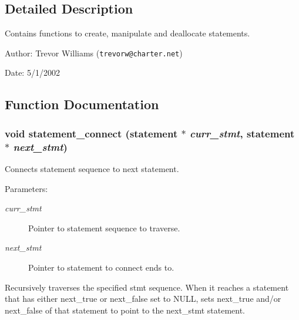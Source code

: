 

\subsection{Detailed Description}
Contains functions to create, manipulate and deallocate statements.

\begin{Desc}
\item[Author:]Trevor Williams ({\tt trevorw@charter.net}) \end{Desc}
\begin{Desc}
\item[Date:]5/1/2002 \end{Desc}


\subsection{Function Documentation}
\subsubsection{\setlength{\rightskip}{0pt plus 5cm}void statement\_\-connect ({\bf statement} $\ast$ {\em curr\_\-stmt}, {\bf statement} $\ast$ {\em next\_\-stmt})}\label{statement_8h_a3}


Connects statement sequence to next statement.

\begin{Desc}
\item[Parameters:]
\begin{description}
\item[{\em curr\_\-stmt}]Pointer to statement sequence to traverse. \item[{\em next\_\-stmt}]Pointer to statement to connect ends to.\end{description}
\end{Desc}
Recursively traverses the specified stmt sequence. When it reaches a statement that has either next\_\-true or next\_\-false set to NULL, sets next\_\-true and/or next\_\-false of that statement to point to the next\_\-stmt statement. 
